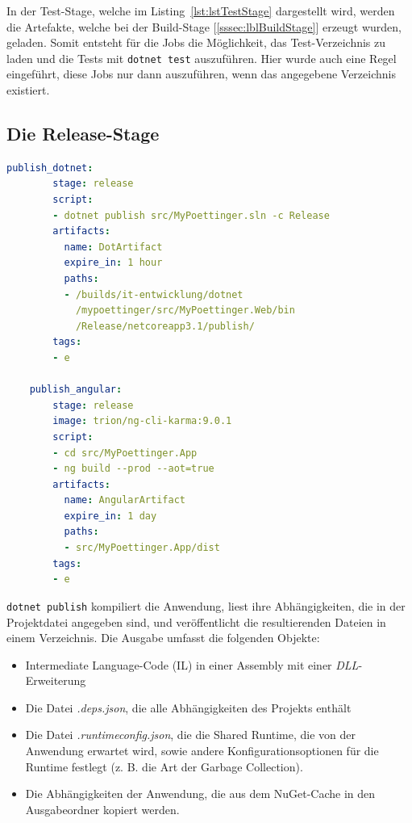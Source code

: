 In der Test-Stage, welche im Listing~\ref{lst:lstTestStage} dargestellt wird, werden die Artefakte, welche bei der Build-Stage [\ref{sssec:lblBuildStage}] erzeugt wurden, geladen. Somit entsteht für die Jobs die Möglichkeit, das Test-Verzeichnis zu laden und die Tests mit \texttt{dotnet test} auszuführen. Hier wurde auch eine Regel eingeführt, diese Jobs nur dann auszuführen, wenn das angegebene Verzeichnis existiert. 


\subsection{Die Release-Stage}

\begin{lstlisting}[caption={Die Release-Stage der gitlab-ci.yml Datei}, language=yaml, label={lst:lstReleaseStage}]
	publish_dotnet:
		stage: release
		script:
		- dotnet publish src/MyPoettinger.sln -c Release
		artifacts:
		  name: DotArtifact
		  expire_in: 1 hour
		  paths:
		  - /builds/it-entwicklung/dotnet
		    /mypoettinger/src/MyPoettinger.Web/bin
		    /Release/netcoreapp3.1/publish/
		tags:
		- e
		
	publish_angular:
		stage: release
		image: trion/ng-cli-karma:9.0.1
		script:
		- cd src/MyPoettinger.App
		- ng build --prod --aot=true
		artifacts:
	  	  name: AngularArtifact
		  expire_in: 1 day
		  paths:
		  - src/MyPoettinger.App/dist
		tags:
		- e
\end{lstlisting}

\colorbox{MyLightGrayBackgroundForCode}{\texttt{dotnet publish}} kompiliert die Anwendung, liest ihre Abhängigkeiten, die in der Projektdatei angegeben sind, und veröffentlicht die resultierenden Dateien in einem Verzeichnis. Die Ausgabe umfasst die folgenden Objekte:\cite{dotnetpublish}

\begin{itemize}
	\item Intermediate Language-Code (IL) in einer Assembly mit einer \textit{DLL}-Erweiterung
	\item Die Datei \textit{.deps.json}, die alle Abhängigkeiten des Projekts enthält
	\item Die Datei \textit{.runtimeconfig.json}, die die Shared Runtime, die von der Anwendung erwartet wird, sowie andere Konfigurationsoptionen für die Runtime festlegt (z. B. die Art der Garbage Collection).
	\item Die Abhängigkeiten der Anwendung, die aus dem NuGet-Cache in den Ausgabeordner kopiert werden.
\end{itemize}

